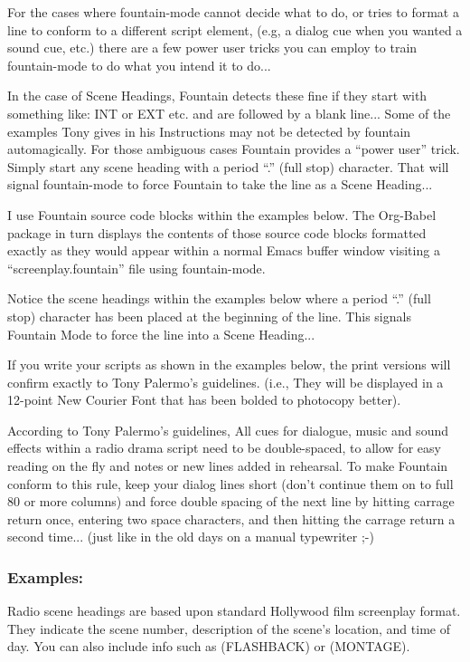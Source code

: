 \documentclass[openleft,oneside,showtrims]{memoir}
\begin{document}
For the cases where fountain-mode cannot decide what to do, or tries to format a line to conform to a different script element, (e.g, a dialog cue when you wanted a sound cue, etc.) there are a few power user tricks you can employ to train fountain-mode to do what you intend it to do...

In the case of Scene Headings, Fountain detects these fine if they start with something like: INT or EXT etc. and are followed by a blank line...  Some of the examples Tony gives in his Instructions may not be detected by fountain automagically. For those ambiguous cases Fountain provides a ``power user'' trick.  Simply start any scene heading with a period ``.'' (full stop) character. That will signal fountain-mode to force Fountain to take the line as a Scene Heading...

I use Fountain source code blocks within the examples below. The Org-Babel package in turn displays the contents of those source code blocks formatted exactly as they would appear within a normal Emacs buffer window visiting a ``screenplay.fountain'' file using fountain-mode.

Notice the scene headings within the examples below where a period ``.'' (full stop) character has been placed at the beginning of the line.  This signals Fountain Mode to force the line into a Scene Heading...

If you write your scripts as shown in the examples below, the print versions will confirm exactly to Tony Palermo's guidelines. (i.e., They will be displayed in a 12-point New Courier Font that has been bolded to photocopy better).

According to Tony Palermo's guidelines, All cues for dialogue, music and sound effects within a radio drama script need to be double-spaced, to allow for easy reading on the fly and notes or new lines added in rehearsal. To make Fountain conform to this rule, keep your dialog lines short (don't continue them on to full 80 or more columns) and force double spacing of the next line by hitting carrage return once, entering two space characters, and then hitting the carrage return a second time... (just like in the old days on a manual typewriter ;-)

\subsubsection*{Examples:}
\label{sec:org25afe20}

Radio scene headings are based upon standard Hollywood film screenplay format. They indicate the scene number, description of the scene's location, and time of day. You can also include info such as (FLASHBACK) or (MONTAGE).
\end{document}
